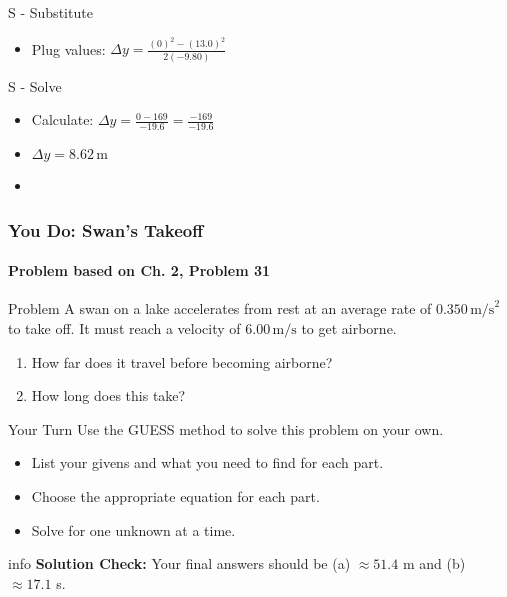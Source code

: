 \documentclass{beamer}
\begin{document}
\begin{frame}
\begin{block}{S - Substitute}
\begin{itemize}
    \item Plug values: $\Delta y = \frac{(0)^2 - (13.0)^2}{2(-9.80)}$
\end{itemize}
\end{block}
\pause
\begin{block}{S - Solve}
\begin{itemize}
    \item Calculate: $\Delta y = \frac{0 - 169}{-19.6} = \frac{-169}{-19.6}$
    \item $\Delta y = 8.62 \, \text{m}$
    \item {}
\end{itemize}
\end{block}
\end{frame}

\begin{frame}
\frametitle{You Do: Swan's Takeoff}
\framesubtitle{Problem based on Ch. 2, Problem 31}
\begin{block}{Problem}
A swan on a lake accelerates from rest at an average rate of $0.350 \, \text{m/s}^2$ to take off. It must reach a velocity of $6.00 \, \text{m/s}$ to get airborne.
\end{block}
\begin{enumerate}
    \item How far does it travel before becoming airborne?
    \item How long does this take?
\end{enumerate}

\begin{block}{Your Turn}
    Use the GUESS method to solve this problem on your own.
    \begin{itemize}
        \item List your givens and what you need to find for each part.
        \item Choose the appropriate equation for each part.
        \item Solve for one unknown at a time.
    \end{itemize}
\end{block}

\pause

\begin{beamercolorbox}[rounded=true,shadow=true]{info}
\centering
\textbf{Solution Check:} Your final answers should be (a) $\approx 51.4$ m and (b) $\approx 17.1$ s.
\end{beamercolorbox}

\end{frame}
\end{document}

